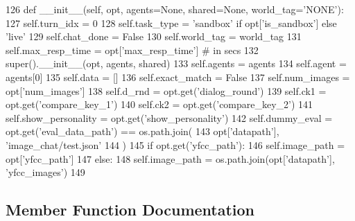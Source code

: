 \begin{DoxyCode}
126     \textcolor{keyword}{def }\_\_init\_\_(self, opt, agents=None, shared=None, world\_tag='NONE'):
127         self.turn\_idx = 0
128         self.task\_type = \textcolor{stringliteral}{'sandbox'} \textcolor{keywordflow}{if} opt[\textcolor{stringliteral}{'is\_sandbox'}] \textcolor{keywordflow}{else} \textcolor{stringliteral}{'live'}
129         self.chat\_done = \textcolor{keyword}{False}
130         self.world\_tag = world\_tag
131         self.max\_resp\_time = opt[\textcolor{stringliteral}{'max\_resp\_time'}]  \textcolor{comment}{# in secs}
132         super().\_\_init\_\_(opt, agents, shared)
133         self.agents = agents
134         self.agent = agents[0]
135         self.data = []
136         self.exact\_match = \textcolor{keyword}{False}
137         self.num\_images = opt[\textcolor{stringliteral}{'num\_images'}]
138         self.d\_rnd = opt.get(\textcolor{stringliteral}{'dialog\_round'})
139         self.ck1 = opt.get(\textcolor{stringliteral}{'compare\_key\_1'})
140         self.ck2 = opt.get(\textcolor{stringliteral}{'compare\_key\_2'})
141         self.show\_personality = opt.get(\textcolor{stringliteral}{'show\_personality'})
142         self.dummy\_eval = opt.get(\textcolor{stringliteral}{'eval\_data\_path'}) == os.path.join(
143             opt[\textcolor{stringliteral}{'datapath'}], \textcolor{stringliteral}{'image\_chat/test.json'}
144         )
145         \textcolor{keywordflow}{if} opt.get(\textcolor{stringliteral}{'yfcc\_path'}):
146             self.image\_path = opt[\textcolor{stringliteral}{'yfcc\_path'}]
147         \textcolor{keywordflow}{else}:
148             self.image\_path = os.path.join(opt[\textcolor{stringliteral}{'datapath'}], \textcolor{stringliteral}{'yfcc\_images'})
149 
\end{DoxyCode}


\subsection{Member Function Documentation}
\mbox{\label{classstack__rank__evals_1_1worlds_1_1MTurkImageChatStackRankWorld_a9c6f889227e1aec6ad1dbaa4150b1625}} 
